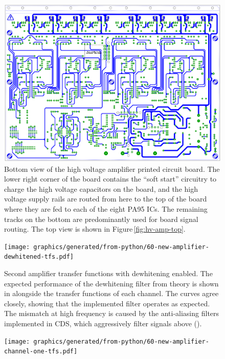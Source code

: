 \begin{figure}
  \centering
  \includegraphics[width=\columnwidth]{graphics/60-hv-amp-bottom.pdf}
  \caption[High voltage amplifier board layout (bottom)]{\label{fig:hv-amp-bottom}Bottom view of the high voltage amplifier printed circuit board. The lower right corner of the board contains the ``soft start'' circuitry to charge the high voltage capacitors on the board, and the high voltage supply rails are routed from here to the top of the board where they are fed to each of the eight PA95 ICs. The remaining tracks on the bottom are predominantly used for board signal routing. The top view is shown in Figure\,\ref{fig:hv-amp-top}.}
\end{figure}

\begin{figure}
  \centering
  \texttt{[image: graphics/generated/from-python/60-new-amplifier-dewhitened-tfs.pdf]}
  \caption[Frequency response of the high voltage amplifier's channels with dewhitening enabled]{Second amplifier transfer functions with dewhitening enabled. The expected performance of the dewhitening filter from theory is shown in  alongside the transfer functions of each channel. The curves agree closely, showing that the implemented filter operates as expected. The mismatch at high frequency is caused by the anti-aliasing filters implemented in CDS, which aggressively filter signals above  ().}
  \label{fig:new-amplifier-dewhitened-tfs}
\end{figure}

\begin{figure}
  \centering
  \texttt{[image: graphics/generated/from-python/60-new-amplifier-channel-one-tfs.pdf]}
  \caption[]{}
  \label{fig:new-amplifier-dewhitened-tfs}
\end{figure}

